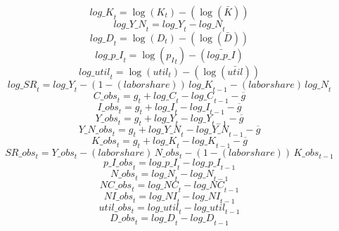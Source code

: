 \begin{dmath}
{log\_K}_{t}=\log\left({{K}}_{t}\right)-(\log\left(\bar{{K}}\right))
\end{dmath}
\begin{dmath}
{log\_Y\_N}_{t}={log\_Y}_{t}-{log\_N}_{t}
\end{dmath}
\begin{dmath}
{log\_D}_{t}=\log\left({{D}}_{t}\right)-(\log\left(\bar{{D}}\right))
\end{dmath}
\begin{dmath}
{log\_p\_I}_{t}=\log\left({{p_I}}_{t}\right)-(\bar{log\_p\_I})
\end{dmath}
\begin{dmath}
{log\_util}_{t}=\log\left({{util}}_{t}\right)-(\log\left(\bar{{util}}\right))
\end{dmath}
\begin{dmath}
{log\_SR}_{t}={log\_Y}_{t}-\left(1-{(labor share)}\right)\, {log\_K}_{t-1}-{(labor share)}\, {log\_N}_{t}
\end{dmath}
\begin{dmath}
{C\_obs}_{t}={{g}}_{t}+{log\_C}_{t}-{log\_C}_{t-1}-{{\overline{g}}}
\end{dmath}
\begin{dmath}
{I\_obs}_{t}={{g}}_{t}+{log\_I}_{t}-{log\_I}_{t-1}-{{\overline{g}}}
\end{dmath}
\begin{dmath}
{Y\_obs}_{t}={{g}}_{t}+{log\_Y}_{t}-{log\_Y}_{t-1}-{{\overline{g}}}
\end{dmath}
\begin{dmath}
{Y\_N\_obs}_{t}={{g}}_{t}+{log\_Y\_N}_{t}-{log\_Y\_N}_{t-1}-{{\overline{g}}}
\end{dmath}
\begin{dmath}
{K\_obs}_{t}={{g}}_{t}+{log\_K}_{t}-{log\_K}_{t-1}-{{\overline{g}}}
\end{dmath}
\begin{dmath}
{SR\_obs}_{t}={Y\_obs}_{t}-{(labor share)}\, {N\_obs}_{t}-\left(1-{(labor share)}\right)\, {K\_obs}_{t-1}
\end{dmath}
\begin{dmath}
{p\_I\_obs}_{t}={log\_p\_I}_{t}-{log\_p\_I}_{t-1}
\end{dmath}
\begin{dmath}
{N\_obs}_{t}={log\_N}_{t}-{log\_N}_{t-1}
\end{dmath}
\begin{dmath}
{NC\_obs}_{t}={log\_NC}_{t}-{log\_NC}_{t-1}
\end{dmath}
\begin{dmath}
{NI\_obs}_{t}={log\_NI}_{t}-{log\_NI}_{t-1}
\end{dmath}
\begin{dmath}
{util\_obs}_{t}={log\_util}_{t}-{log\_util}_{t-1}
\end{dmath}
\begin{dmath}
{D\_obs}_{t}={log\_D}_{t}-{log\_D}_{t-1}
\end{dmath}
